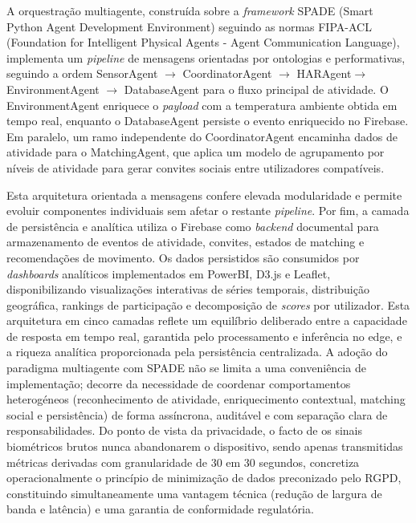 \documentclass[runningheads]{llncs}
\begin{document}
A orquestração multiagente, construída sobre a \textit{framework} SPADE (Smart Python Agent Development Environment) seguindo as normas FIPA-ACL (Foundation for Intelligent Physical Agents - Agent Communication Language), implementa um \textit{pipeline} de mensagens orientadas por ontologias e performativas, seguindo a ordem SensorAgent $\rightarrow$ CoordinatorAgent $\rightarrow$ HARAgent$\rightarrow$ EnvironmentAgent $\rightarrow$ DatabaseAgent para o fluxo principal de atividade. O EnvironmentAgent enriquece o \textit{payload} com a temperatura ambiente obtida em tempo real, enquanto o DatabaseAgent persiste o evento enriquecido no Firebase. Em paralelo, um ramo independente do CoordinatorAgent encaminha dados de atividade para o MatchingAgent, que aplica um modelo de agrupamento por níveis de atividade para gerar convites sociais entre utilizadores compatíveis. 

Esta arquitetura orientada a mensagens confere elevada modularidade e permite evoluir componentes individuais sem afetar o restante \textit{pipeline}. 
Por fim, a camada de persistência e analítica utiliza o Firebase como \textit{backend} documental para armazenamento de eventos de atividade, convites, estados de matching e recomendações de movimento. Os dados persistidos são consumidos por \textit{dashboards} analíticos implementados em PowerBI, D3.js e Leaflet, disponibilizando visualizações interativas de séries temporais, distribuição geográfica, rankings de participação e decomposição de \textit{scores} por utilizador. 
Esta arquitetura em cinco camadas reflete um equilíbrio deliberado entre a capacidade de resposta em tempo real, garantida pelo processamento e inferência no edge, e a riqueza analítica proporcionada pela persistência centralizada. A adoção do paradigma multiagente com SPADE não se limita a uma conveniência de implementação; decorre da necessidade de coordenar comportamentos heterogéneos (reconhecimento de atividade, enriquecimento contextual, matching social e persistência) de forma assíncrona, auditável e com separação clara de responsabilidades. Do ponto de vista da privacidade, o facto de os sinais biométricos brutos nunca abandonarem o dispositivo, sendo apenas transmitidas métricas derivadas com granularidade de 30 em 30 segundos, concretiza operacionalmente o princípio de minimização de dados preconizado pelo RGPD, constituindo simultaneamente uma vantagem técnica (redução de largura de banda e latência) e uma garantia de conformidade regulatória. 
\end{document}
